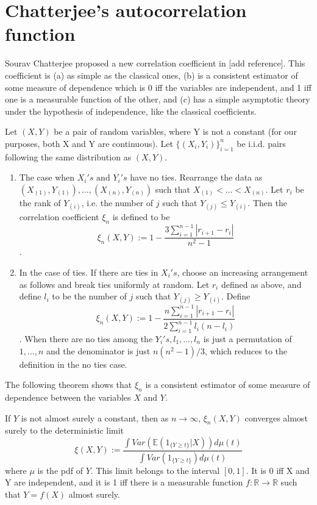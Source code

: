 \chapter{Chatterjee's autocorrelation function}

Sourav Chatterjee proposed a new correlation coefficient in [add reference].
This coefficient is (a) as simple as the classical ones, (b) is a consistent estimator of some measure of dependence which is 0 iff the variables are independent, and 1 iff one is a measurable function of the other, and (c) has a simple asymptotic theory under the hypothesis of independence, like the classical coefficients.
\newline
\begin{definition}
	Let $(X, Y)$ be a pair of random variables, where Y is not a constant (for our purposes, both X and Y are continuous). Let $\{(X_i, Y_i)\}_{i = 1}^{n}$ be i.i.d. pairs following the same distribution as $(X, Y)$.
	\begin{enumerate}
		\item The case when $X_i's \text{ and } Y_i's$ have no ties. Rearrange the data as\\ $(X_{(1)}, Y_{(1)}), \dots, (X_{(n)}, Y_{(n)})$ such that $X_{(1)} < \dots < X_{(n)}$. Let $r_i$ be the rank of $Y_{(i)}$, i.e. the number of $j$ such that $Y_{(j)} \leq Y_{(i)}$.  Then the correlation coefficient $\xi_n$ is defined to be
		$$\xi_n(X, Y) := 1-\frac{3\sum_{i=1}^{n-1} |r_{i+1} - r_i|}{n^2-1}$$.

		\item In the case of ties. If there are ties in $X_i's$, choose an increasing arrangement as follows and break ties uniformly at random. Let $r_i$ defined as above, and define $l_i$ to be the number of $j$ such that $Y_{(j)} \geq Y_{(i)}$. Define
		$$\xi_n(X, Y) := 1-\frac{n\sum_{i=1}^{n-1} |r_{i+1} - r_i|}{2\sum_{i=1}^{n-1}l_i(n-l_i)}$$.
		When there are no ties among the $Y_i's, l_1, \dots, l_n$ is just a permutation of $1, \dots, n$ and the denominator is just $n(n^2-1)/3$, which reduces to the definition in the no ties case.
	\end{enumerate}
\end{definition}

The following theorem shows that $\xi_n$ is a consistent estimator of some measure of dependence between the variables $X$ and $Y$.

\begin{theorem}
If $Y$ is not almost surely a constant, then as $n \rightarrow \infty$, $\xi_n(X, Y)$ converges almost surely to the deterministic limit
$$\xi(X, Y) := \frac{\int Var(\mathbb{E}(1_{\{Y \geq t\}}|X)) d\mu(t)}{\int Var(1_{\{Y \geq t\}}) d\mu(t)}$$
where $\mu$ is the pdf of $Y$. This limit belongs to the interval $[0, 1]$. It is 0 iff X and Y are independent, and it is 1 iff there is a measurable function $f:\mathbb{R} \rightarrow \mathbb{R}$ such that $Y = f(X)$ almost surely.
\end{theorem}

